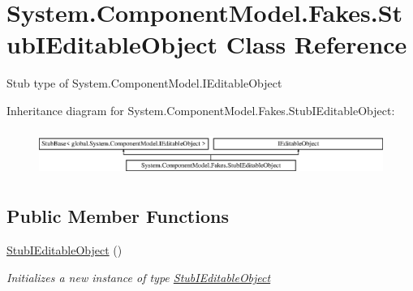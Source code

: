 \hypertarget{class_system_1_1_component_model_1_1_fakes_1_1_stub_i_editable_object}{\section{System.\-Component\-Model.\-Fakes.\-Stub\-I\-Editable\-Object Class Reference}
\label{class_system_1_1_component_model_1_1_fakes_1_1_stub_i_editable_object}
}


Stub type of System.\-Component\-Model.\-I\-Editable\-Object 


Inheritance diagram for System.\-Component\-Model.\-Fakes.\-Stub\-I\-Editable\-Object\-:\begin{figure}[H]
\begin{center}
\leavevmode
\includegraphics[height=1.530055cm]{class_system_1_1_component_model_1_1_fakes_1_1_stub_i_editable_object}
\end{center}
\end{figure}
\subsection*{Public Member Functions}
\begin{DoxyCompactItemize}
\item 
\hyperlink{class_system_1_1_component_model_1_1_fakes_1_1_stub_i_editable_object_a74c6792b4dcb08ea26689364a9d8cb17}{Stub\-I\-Editable\-Object} ()
\begin{DoxyCompactList}\small\item\em Initializes a new instance of type \hyperlink{class_system_1_1_component_model_1_1_fakes_1_1_stub_i_editable_object}{Stub\-I\-Editable\-Object}\end{DoxyCompactList}\end{DoxyCompactItemize}
